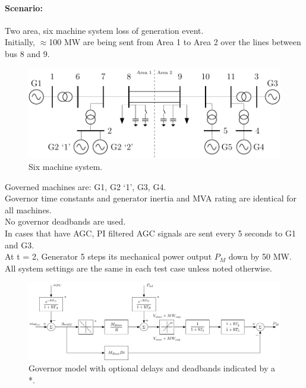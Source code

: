 \documentclass[12pt]{article}
\begin{document}
\paragraph{Scenario: } 
Two area, six machine system loss of generation event. \\
Initially, $\approx$100 MW are being sent from Area 1 to Area 2 over the lines between bus 8 and 9.\\

\begin{figure}[!ht]
	\centering
	\footnotesize
	\includegraphics[width=.85\linewidth]{../../models/sixMachine/sixMachine}
	\caption{Six machine system.}
	\label{fig: six machine}
\end{figure}


Governed machines are: G1, G2 `1', G3, G4.\\
Governor time constants and generator inertia and MVA rating are identical for all machines.\\
No governor deadbands are used.\\
In cases that have AGC, PI filtered AGC signals are sent every 5 seconds to G1 and G3.\\

At t = 2, Generator 5 steps its mechanical power output $P_M$ down by 50 MW.\\

All system settings are the same in each test case unless noted otherwise.\\

\begin{figure}[!ht]
	\centering
	\footnotesize
	\includegraphics[width=.9\linewidth]{../../models/tgov1/tgov1DBdelay}
	\caption{Governor model with optional delays and deadbands indicated by a *.}
	\label{fig: modified tgov}
\end{figure}
\end{document}
